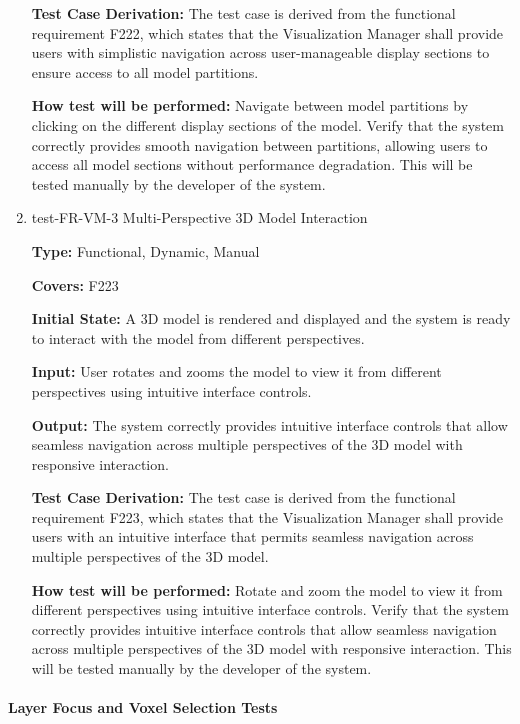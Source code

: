 \documentclass[12pt, titlepage]{article}
\begin{document}
\begin{enumerate}
\textbf{Test Case Derivation:} The test case is derived from the functional requirement F222, which states that the Visualization Manager shall provide users with simplistic navigation across user-manageable display sections to ensure access to all model partitions.
					
\textbf{How test will be performed:} Navigate between model partitions by clicking on the different display sections of the model. Verify that the system correctly provides smooth navigation between partitions, allowing users to access all model sections without performance degradation. This will be tested manually by the developer of the system.

\item{test-FR-VM-3 Multi-Perspective 3D Model Interaction\\}

\textbf{Type:} Functional, Dynamic, Manual

\textbf{Covers:} F223
					
\textbf{Initial State:} A 3D model is rendered and displayed and the system is ready to interact with the model from different perspectives.
					
\textbf{Input:} User rotates and zooms the model to view it from different perspectives using intuitive interface controls.
					
\textbf{Output:} The system correctly provides intuitive interface controls that allow seamless navigation across multiple perspectives of the 3D model with responsive interaction.

\textbf{Test Case Derivation:} The test case is derived from the functional requirement F223, which states that the Visualization Manager shall provide users with an intuitive interface that permits seamless navigation across multiple perspectives of the 3D model.
					
\textbf{How test will be performed:} Rotate and zoom the model to view it from different perspectives using intuitive interface controls. Verify that the system correctly provides intuitive interface controls that allow seamless navigation across multiple perspectives of the 3D model with responsive interaction. This will be tested manually by the developer of the system.

\end{enumerate}

\paragraph{Layer Focus and Voxel Selection Tests}
\end{document}
